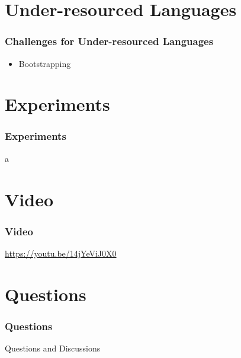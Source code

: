 \section{Under-resourced Languages}
\begin{frame}
\frametitle{Challenges for Under-resourced Languages}
\begin{itemize}
\item Bootstrapping
\end{itemize}
\end{frame}
%

\section{Experiments}
\begin{frame}
\frametitle{Experiments}
a
\end{frame}



\section*{Video}
\begin{frame}
\frametitle{Video}
\begin{center}
\url{https://youtu.be/14jYeViJ0X0}
\end{center}
\end{frame}


\section*{Questions}

\begin{frame}
\frametitle{Questions}
\begin{center}
Questions and Discussions
\end{center}
\end{frame}


%
%



